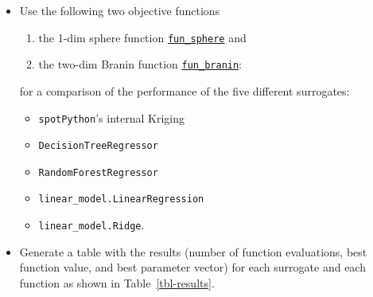 \documentclass[
  letterpaper,
  DIV=11,
  numbers=noendperiod]{scrreprt}
\providecommand{\tightlist}{%
  \setlength{\itemsep}{0pt}\setlength{\parskip}{0pt}}\usepackage{longtable,booktabs,array}
\begin{document}
\begin{itemize}
\item
  Use the following two objective functions

  \begin{enumerate}
  \def\labelenumi{\arabic{enumi}.}
  \tightlist
  \item
    the 1-dim sphere function
    \href{https://github.com/sequential-parameter-optimization/spotPython/blob/main/src/spotPython/fun/objectivefunctions.py}{\texttt{fun\_sphere}}
    and
  \item
    the two-dim Branin function
    \href{https://github.com/sequential-parameter-optimization/spotPython/blob/main/src/spotPython/fun/objectivefunctions.py}{\texttt{fun\_branin}}:
  \end{enumerate}

  for a comparison of the performance of the five different surrogates:

  \begin{itemize}
  \tightlist
  \item
    \texttt{spotPython}'s internal Kriging
  \item
    \texttt{DecisionTreeRegressor}
  \item
    \texttt{RandomForestRegressor}
  \item
    \texttt{linear\_model.LinearRegression}
  \item
    \texttt{linear\_model.Ridge}.
  \end{itemize}
\item
  Generate a table with the results (number of function evaluations,
  best function value, and best parameter vector) for each surrogate and
  each function as shown in Table~\ref{tbl-results}.
\end{itemize}
\end{document}
